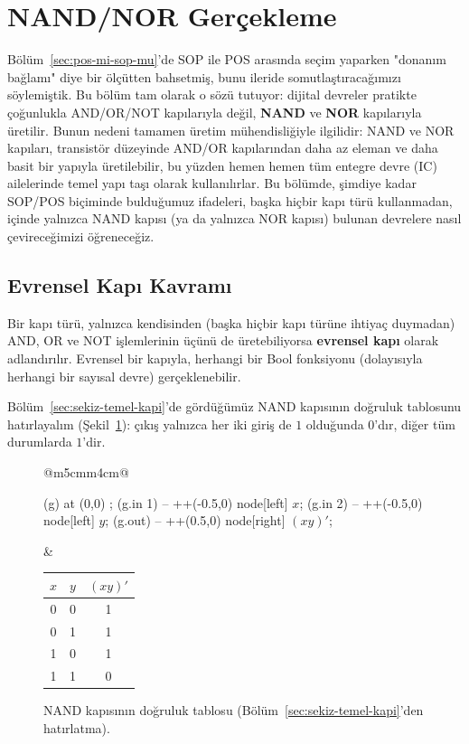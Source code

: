 \section{NAND/NOR Gerçekleme}\label{sec:nandnor}
Bölüm~\ref{sec:pos-mi-sop-mu}'de SOP ile POS arasında seçim yaparken "donanım bağlamı"
diye bir ölçütten bahsetmiş, bunu ileride somutlaştıracağımızı söylemiştik. Bu bölüm tam
olarak o sözü tutuyor: dijital devreler pratikte çoğunlukla AND/OR/NOT kapılarıyla değil,
\textbf{NAND} ve \textbf{NOR} kapılarıyla üretilir. Bunun nedeni tamamen üretim
mühendisliğiyle ilgilidir: NAND ve NOR kapıları, transistör düzeyinde AND/OR kapılarından
daha az eleman ve daha basit bir yapıyla üretilebilir, bu yüzden hemen hemen tüm entegre
devre (IC) ailelerinde temel yapı taşı olarak kullanılırlar. Bu bölümde, şimdiye kadar
SOP/POS biçiminde bulduğumuz ifadeleri, başka hiçbir kapı türü kullanmadan, içinde
yalnızca NAND kapısı (ya da yalnızca NOR kapısı) bulunan devrelere nasıl
çevireceğimizi öğreneceğiz.

\subsection{Evrensel Kapı Kavramı}\label{sec:nandnor-evrensel}
\begin{tanim}
Bir kapı türü, yalnızca kendisinden (başka hiçbir kapı türüne ihtiyaç duymadan) AND, OR
ve NOT işlemlerinin üçünü de üretebiliyorsa \textbf{evrensel kapı} olarak adlandırılır.
Evrensel bir kapıyla, herhangi bir Bool fonksiyonu (dolayısıyla herhangi bir sayısal
devre) gerçeklenebilir.
\end{tanim}

Bölüm~\ref{sec:sekiz-temel-kapi}'de gördüğümüz NAND kapısının doğruluk tablosunu
hatırlayalım (Şekil~\ref{fig:kapi-nand-hatirlatma}): çıkış yalnızca her iki giriş de
$1$ olduğunda $0$'dır, diğer tüm durumlarda $1$'dir.

\begin{figure}[H]
\centering
\begin{tabular}{@{}m{5cm}m{4cm}@{}}
\begin{circuitikz}[scale=1, font=\small]
\node[nand port, number inputs=2] (g) at (0,0) {};
\draw (g.in 1) -- ++(-0.5,0) node[left] {$x$};
\draw (g.in 2) -- ++(-0.5,0) node[left] {$y$};
\draw (g.out) -- ++(0.5,0) node[right] {$(xy)'$};
\end{circuitikz}
&
\begin{tabular}{cc|c}
\toprule
$x$&$y$&$(xy)'$\\
\midrule
0&0&1\\0&1&1\\1&0&1\\1&1&0\\
\bottomrule
\end{tabular}
\end{tabular}
\caption{NAND kapısının doğruluk tablosu (Bölüm~\ref{sec:sekiz-temel-kapi}'den hatırlatma).}
\label{fig:kapi-nand-hatirlatma}
\end{figure}

